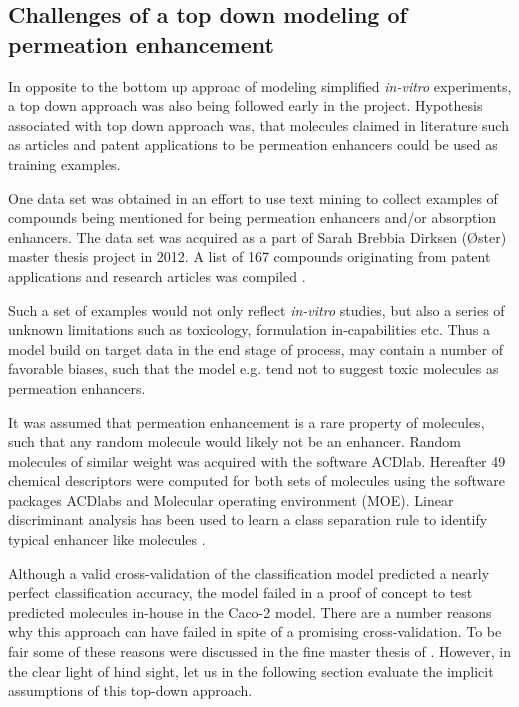 \subsection{Challenges of a top down modeling of permeation enhancement}
In opposite to the bottom up approac of modeling simplified \textit{in-vitro} experiments, a top down approach was also being followed early in the project. Hypothesis associated with top down approach was, that molecules claimed in literature such as articles and patent applications to be permeation enhancers could be used as training examples.

One data set was obtained in an effort to use text mining to collect examples of compounds being mentioned for being permeation enhancers and/or absorption enhancers. The data set was acquired as a part of Sarah Brebbia Dirksen (Øster) master thesis project in 2012. A list of 167 compounds originating from patent applications and research articles was compiled \cite{sara2012application}.

Such a set of examples would not only reflect \textit{in-vitro} studies, but also a series of unknown limitations such as toxicology, formulation in-capabilities etc. Thus a model build on target data in the end stage of process, may contain a number of favorable biases, such that the model e.g. tend not to suggest toxic molecules as permeation enhancers.

It was assumed that permeation enhancement is a rare property of molecules, such that any random molecule would likely not be an enhancer. Random molecules of similar weight was acquired with the software ACDlab. Hereafter 49 chemical descriptors were computed for both sets of molecules using the software packages ACDlabs and Molecular operating environment (MOE). Linear discriminant analysis has been used to learn a class separation rule to identify typical enhancer like molecules \cite{sara2012application}.

Although a valid cross-validation of the classification model predicted a nearly perfect classification accuracy, the model failed in a proof of concept to test predicted molecules in-house in the Caco-2 model. There are a number reasons why this approach can have failed in spite of a promising cross-validation. To be fair some of these reasons were discussed in the fine master thesis of \cite{sara2012application}. However, in the clear light of hind sight, let us in the following section evaluate the implicit assumptions of this top-down approach.

